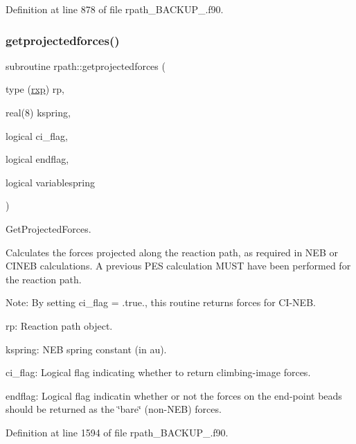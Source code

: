 Definition at line 878 of file rpath\+\_\+\+B\+A\+C\+K\+U\+P\+\_.\+f90.

\mbox{\label{namespacerpath_a94586723a045fa2d44e3f6b6a91d1d50}} 
\subsubsection{\texorpdfstring{getprojectedforces()}{getprojectedforces()}}
{\footnotesize\ttfamily subroutine rpath\+::getprojectedforces (\begin{DoxyParamCaption}\item[{type (\mbox{\hyperlink{structrpath_1_1rxp}{rxp}})}]{rp,  }\item[{real(8)}]{kspring,  }\item[{logical}]{ci\+\_\+flag,  }\item[{logical}]{endflag,  }\item[{logical}]{variablespring }\end{DoxyParamCaption})}



Get\+Projected\+Forces. 

Calculates the forces projected along the reaction path, as required in N\+EB or C\+I\+N\+EB calculations. A previous P\+ES calculation M\+U\+ST have been performed for the reaction path.

Note\+: By setting ci\+\_\+flag = .true., this routine returns forces for C\+I-\/\+N\+EB.


\begin{DoxyItemize}
\item rp\+: Reaction path object.
\item kspring\+: N\+EB spring constant (in au).
\item ci\+\_\+flag\+: Logical flag indicating whether to return climbing-\/image forces.
\item endflag\+: Logical flag indicatin whether or not the forces on the end-\/point beads should be returned as the \char`\"{}bare\char`\"{} (non-\/\+N\+EB) forces. 
\end{DoxyItemize}

Definition at line 1594 of file rpath\+\_\+\+B\+A\+C\+K\+U\+P\+\_.\+f90.

\mbox{\label{namespacerpath_a77818427a2d3efbe627d872dd929e11e}} 
